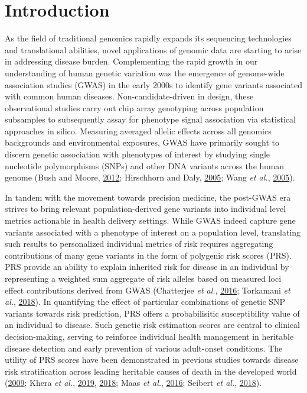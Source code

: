 \documentclass{ws-procs11x85}
\begin{document}
\section{Introduction}\label{introduction}

As the field of traditional genomics rapidly expands its sequencing
technologies and translational abilities, novel applications of genomic
data are starting to arise in addressing disease burden. Complementing
the rapid growth in our understanding of human genetic variation was the
emergence of genome-wide association studies (GWAS) in the early 2000s
to identify gene variants associated with common human diseases.
Non-candidate-driven in design, these observational studies carry out
chip array genotyping across population subsamples to subsequently assay
for phenotype signal association via statistical approaches in silico.
Measuring averaged allelic effects across all genomics backgrounds and
environmental exposures, GWAS have primarily sought to discern genetic
association with phenotypes of interest by studying single nucleotide
polymorphisms (SNPs) and other DNA variants across the human genome
(Bush and Moore, \protect\hyperlink{ref-iFUfVw9V}{2012}; Hirschhorn and
Daly, \protect\hyperlink{ref-5cdeEdUS}{2005}; Wang \emph{et al.},
\protect\hyperlink{ref-12kQ0EOWQ}{2005}).

In tandem with the movement towards precision medicine, the post-GWAS
era strives to bring relevant population-derived gene variants into
individual level metrics actionable in health delivery settings. While
GWAS indeed capture gene variants associated with a phenotype of
interest on a population level, translating such results to personalized
individual metrics of risk requires aggregating contributions of many
gene variants in the form of polygenic risk scores (PRS). PRS provide an
ability to explain inherited risk for disease in an individual by
representing a weighted sum aggregate of risk alleles based on measured
loci effect contributions derived from GWAS (Chatterjee \emph{et al.},
\protect\hyperlink{ref-auyRflEe}{2016}; Torkamani \emph{et al.},
\protect\hyperlink{ref-1GK3F1BxE}{2018}). In quantifying the effect of
particular combinations of genetic SNP variants towards risk prediction,
PRS offers a probabilisitic susceptibility value of an individual to
disease. Such genetic risk estimation scores are central to clinical
decision-making, serving to reinforce individual health management in
heritable disease detection and early prevention of various adult-onset
conditions. The utility of PRS scores have been demonstrated in previous
studies towards disease risk stratification across leading heritable
causes of death in the developed world
(\protect\hyperlink{ref-mwTa2RUK}{2009}; Khera \emph{et al.},
\protect\hyperlink{ref-oBD9eYkN}{2019},
\protect\hyperlink{ref-Gh0gKn77}{2018}; Maas \emph{et al.},
\protect\hyperlink{ref-Z12fynub}{2016}; Seibert \emph{et al.},
\protect\hyperlink{ref-gkABDVTx}{2018}).
\end{document}
